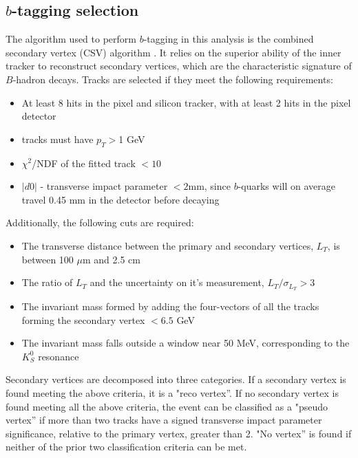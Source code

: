 \subsection{$b$-tagging selection}
\label{btag_overview}

\par The algorithm used to perform $b$-tagging in this analysis is the
combined secondary vertex (CSV) algorithm \cite{Weiser:927399}.  It
relies on the superior ability of the inner tracker to reconstruct
secondary vertices, which are the characteristic signature of
$B$-hadron decays.  Tracks are selected if they meet the following
requirements: 
\begin{itemize}
  \item At least 8 hits in the pixel and silicon tracker, with at
    least 2 hits in the pixel detector
  \item tracks must have $p_{T}>$1 GeV
  \item $\chi^{2}$/NDF of the fitted track $< 10$
  \item $|d0|$ - transverse impact parameter $< 2$mm, since $b$-quarks
    will on average travel 0.45 mm in the detector before decaying
\end{itemize}

\noindent  Additionally, the following cuts are required:
\begin{itemize}
  \item The transverse distance between the primary and secondary
    vertices, $L_{T}$, is between 100 $\mu$m and 2.5 cm
  \item The ratio of $L_{T}$ and the uncertainty on it's measurement,
    $L_{T}/\sigma_{L_{T}}>$3 
  \item The invariant mass formed by adding the four-vectors of all
    the tracks forming the secondary vertex $< 6.5$ GeV
  \item The invariant mass falls outside a window near 50 MeV,
    corresponding to the $K_{S}^{0}$ resonance
\end{itemize}

\noindent  Secondary vertices are decomposed into three categories.
If a secondary vertex is found meeting the above criteria, it is a
"reco vertex''.  If no secondary vertex is found meeting all the above
criteria, the event can be classified as a "pseudo vertex'' if more
than two tracks have a signed transverse impact parameter
significance, relative to the primary vertex, greater than 2.  "No
vertex'' is found if neither of the prior two classification criteria
can be met.  
 
